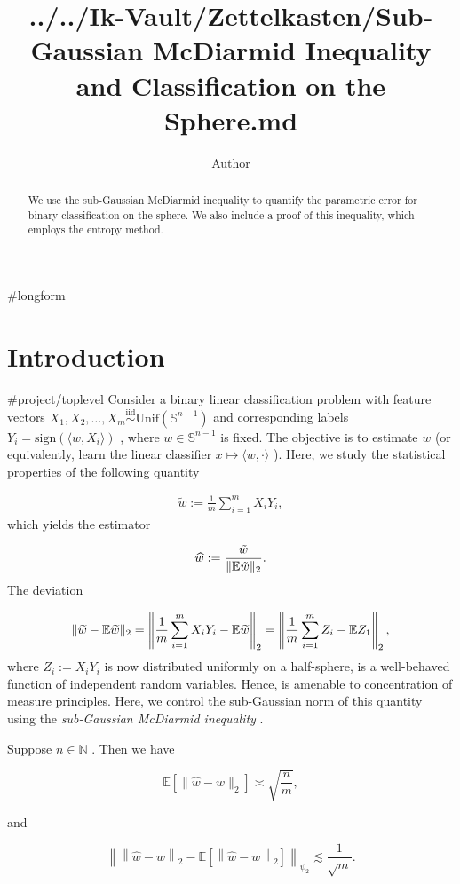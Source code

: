 \documentclass{article}
\title{../../Ik-Vault/Zettelkasten/Sub-Gaussian McDiarmid Inequality and Classification on the Sphere.md}
\author{Author}
\begin{document}
\maketitle
\begin{abstract}
We use the sub-Gaussian McDiarmid inequality to quantify the parametric error for binary classification on the sphere. We also include a proof of this inequality, which employs the entropy method.


\end{abstract}
#longform

\section{Introduction}
\label{section:Introduction}
#project/toplevel 
Consider a binary linear classification problem with feature vectors  $X_1, X_2, \dots, X_m \stackrel{\text{iid}}{\sim} \mathrm{Unif}(\mathbb{S}^{n-1})$  and corresponding labels  $Y_i = \mathrm{sign}(\langle w, X_i \rangle)$ , where  $w \in \mathbb{S}^{n-1}$  is fixed. The objective is to estimate  $w$  (or equivalently, learn the linear classifier  $x \mapsto \langle w, \cdot \rangle$ ). Here, we study the statistical properties of the following quantity

\begin{align}
\widetilde{w} := \frac{1}{m}\sum_{i=1}^m X_i Y_i,
\end{align}
which yields the estimator

\begin{align}
\widehat{w} := \frac{\tilde{w}}{\|\mathbb{E}\tilde{w}\|_{2}}.
\end{align}
The deviation

\begin{align*}
\|\widetilde{w} - \mathbb{E} \widetilde{w}\|_2 = \left\|\frac{1}{m}\sum_{i=1}^m X_i Y_i - \mathbb{E} \widetilde{w}\right\|_2 = \left\|\frac{1}{m}\sum_{i=1}^m Z_i - \mathbb{E} Z_1\right\|_2,
\end{align*}
where  $Z_i := X_i Y_i$  is now distributed uniformly on a half-sphere, is a well-behaved function of independent random variables. Hence, is amenable to concentration of measure principles. Here, we control the sub-Gaussian norm of this quantity using the  \textit{sub-Gaussian McDiarmid inequality}  \cite{maurerConcentrationInequalitiesSubGaussian2021}.


\begin{theorem}
\label{Characterisation of Estimation Error}
Suppose  $n \in \mathbb{N}$ . Then we have


\begin{equation*}
\mathbb{E}\left[\|\widehat{w}-w\|_2\right] \asymp \sqrt{\frac{n}{m}},
\end{equation*}

and


\begin{equation*}
\left\lVert \left\lVert \widehat{w} - w \right\rVert_2 - \mathbb{E}\left[\left\lVert \widehat{w} - w \right\rVert_2 \right] \right\rVert_{\psi_2} \lesssim  \frac{1}{\sqrt{ m }}.
\end{equation*}


\end{theorem}
\end{document}
